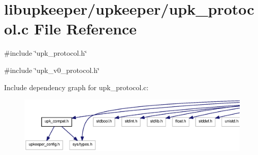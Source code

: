 \section{libupkeeper/upkeeper/upk\_\-protocol.c File Reference}
\label{upk__protocol_8c}
{\ttfamily \#include \char`\"{}upk\_\-protocol.h\char`\"{}}\par
{\ttfamily \#include \char`\"{}upk\_\-v0\_\-protocol.h\char`\"{}}\par
Include dependency graph for upk\_\-protocol.c:
\nopagebreak
\begin{figure}[H]
\begin{center}
\leavevmode
\includegraphics[width=400pt]{upk__protocol_8c__incl}
\end{center}
\end{figure}
